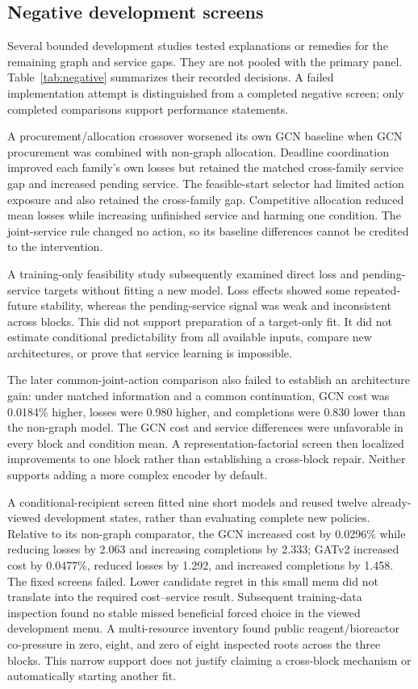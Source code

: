 \documentclass[preprint,12pt]{elsarticle}
\begin{document}
\subsection{Negative development screens}
Several bounded development studies tested explanations or remedies for the
remaining graph and service gaps. They are not pooled with the primary panel.
Table~\ref{tab:negative} summarizes their recorded decisions. A failed
implementation attempt is distinguished from a completed negative screen;
only completed comparisons support performance statements.

A procurement/allocation crossover worsened its own GCN baseline when GCN
procurement was combined with non-graph allocation. Deadline coordination
improved each family's own losses but retained the matched cross-family service
gap and increased pending service. The feasible-start selector had limited
action exposure and also retained the cross-family gap. Competitive allocation
reduced mean losses while increasing unfinished service and harming one
condition. The joint-service rule changed no action, so its baseline differences
cannot be credited to the intervention.

A training-only feasibility study subsequently examined direct loss and
pending-service targets without fitting a new model. Loss effects showed some
repeated-future stability, whereas the pending-service signal was weak and
inconsistent across blocks. This did not support preparation of a target-only
fit. It did not estimate conditional predictability from all available inputs,
compare new architectures, or prove that service learning is impossible.

The later common-joint-action comparison also failed to establish an
architecture gain: under matched information and a common continuation,
GCN cost was 0.0184\% higher, losses were 0.980 higher, and completions were
0.830 lower than the non-graph model. The GCN cost and service differences
were unfavorable in every block and condition mean. A representation-factorial
screen then localized improvements to one block rather than establishing a
cross-block repair. Neither supports adding a more complex encoder by default.

A conditional-recipient screen fitted nine short models and reused twelve
already-viewed development states, rather than evaluating complete new policies.
Relative to its non-graph comparator, the GCN increased cost by 0.0296\% while
reducing losses by 2.063 and increasing completions by 2.333; GATv2 increased
cost by 0.0477\%, reduced losses by 1.292, and increased completions by 1.458.
The fixed screens failed. Lower candidate regret in this small menu did not
translate into the required cost--service result. Subsequent training-data
inspection found no stable missed beneficial forced choice in the viewed
development menu. A multi-resource inventory found public reagent/bioreactor
co-pressure in zero, eight, and zero of eight inspected roots across the three
blocks. This narrow support does not justify claiming a cross-block mechanism
or automatically starting another fit.
\end{document}

